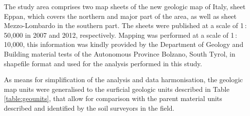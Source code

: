 \documentclass[preprint,12pt,authoryear]{elsarticle}
\begin{document}
The study area comprises two map sheets of the new geologic map of Italy, sheet Eppan,  which covers the northern and major part of the area, as well as sheet Mezzo-Lombardo in the southern part. The sheets were published at a scale of 1\,:\,50,000 in 2007 and 2012, respectively. Mapping was performed at a scale of 1\,:\,10,000, this information was kindly provided by the Department of Geology and Building material tests of the Autonomous Province Bolzano, South Tyrol, in shapefile format and used for the analysis performed in this study.
 
As means for simplification of the analysis and data harmonisation, the geologic map units were generalised to the surficial geologic units described in Table \ref{table:geounits}, that allow for comparison with the parent material units described and identified by the soil surveyors in the field.
\end{document}
